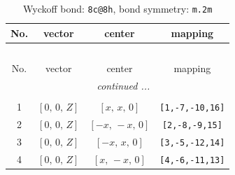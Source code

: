 \documentclass[fleqn,8pt]{jsarticle}
\begin{document}
\renewcommand{\arraystretch}{1.2}
\begin{longtable}{cccc}
\caption{Wyckoff bond: {\tt 8c@8h}, bond symmetry: {\tt m.2m}}
 \\
 \hline \hline
No. & vector & center & mapping \\ \hline \endfirsthead

\multicolumn{3}{l}{\tablename\ \thetable{}} \\
 \hline \hline
No. & vector & center & mapping \\ \hline \endhead

 \hline \hline
\multicolumn{3}{r}{\footnotesize\it continued ...} \\ \endfoot

 \hline \hline
\multicolumn{3}{r}{} \\ \endlastfoot

1 & $\left[ 0,\, 0,\, Z \right]$ & $\left[ x,\, x,\, 0 \right]$ & {\tt [1,-7,-10,16]} \\ \hline
2 & $\left[ 0,\, 0,\, Z \right]$ & $\left[ - x,\, - x,\, 0 \right]$ & {\tt [2,-8,-9,15]} \\ \hline
3 & $\left[ 0,\, 0,\, Z \right]$ & $\left[ - x,\, x,\, 0 \right]$ & {\tt [3,-5,-12,14]} \\ \hline
4 & $\left[ 0,\, 0,\, Z \right]$ & $\left[ x,\, - x,\, 0 \right]$ & {\tt [4,-6,-11,13]} \\
\end{longtable}
\renewcommand{\arraystretch}{1.2}
\end{document}

